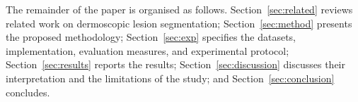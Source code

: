 The remainder of the paper is organised as follows. Section~\ref{sec:related} reviews related work on dermoscopic lesion segmentation; Section~\ref{sec:method} presents the proposed methodology; Section~\ref{sec:exp} specifies the datasets, implementation, evaluation measures, and experimental protocol; Section~\ref{sec:results} reports the results; Section~\ref{sec:discussion} discusses their interpretation and the limitations of the study; and Section~\ref{sec:conclusion} concludes.

